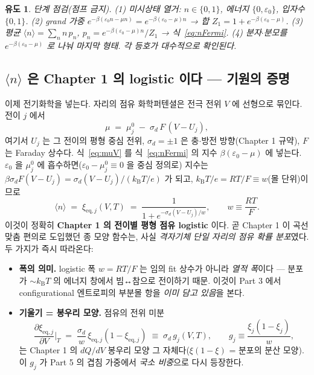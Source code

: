 \documentclass[11pt,a4paper]{article}
\newtheorem*{derivebox}{유도}
\newcommand{\eq}{\mathrm{eq}}
\newcommand{\kB}{k_{\mathrm B}}
\newcommand{\avg}[1]{\langle #1\rangle}
\begin{document}
\begin{derivebox}
\emph{단계 점검(점프 금지).} (1) 미시상태 열거: $n\in\{0,1\}$, 에너지 $\{0,\varepsilon_0\}$, 입자수 $\{0,1\}$.
(2) grand 가중 $e^{-\beta(\varepsilon_0 n-\mu n)}=e^{-\beta(\varepsilon_0-\mu)n}$ → 합 $Z_1=1+e^{-\beta(\varepsilon_0-\mu)}$.
(3) 평균 $\avg n=\sum_n n\,p_n$, $p_n=e^{-\beta(\varepsilon_0-\mu)n}/Z_1$ → 식~\eqref{eq:nFermi}.
(4) 분자$\cdot$분모를 $e^{-\beta(\varepsilon_0-\mu)}$ 로 나눠 마지막 형태. 각 등호가 대수적으로 확인된다.
\end{derivebox}

\subsection{$\avg n$ 은 Chapter 1 의 logistic 이다 — 기원의 증명}\label{sec:logistic}
이제 전기화학을 넣는다. 자리의 점유 화학퍼텐셜은 전극 전위 $V$ 에 선형으로 묶인다. 전이 $j$ 에서
\begin{equation}
\mu \;=\; \mu_j^0 \;-\; \sigma_d\,F\,(V-U_j),
\label{eq:muV}
\end{equation}
여기서 $U_j$ 는 그 전이의 평형 중심 전위, $\sigma_d=\pm1$ 은 충$\cdot$방전 방향(Chapter 1 규약), $F$ 는
Faraday 상수다. 식~\eqref{eq:muV} 를 식~\eqref{eq:nFermi} 의 지수 $\beta(\varepsilon_0-\mu)$ 에 넣는다.
$\varepsilon_0$ 을 $\mu_j^0$ 에 흡수하면($\varepsilon_0-\mu_j^0\equiv0$ 을 중심 정의로) 지수는
$\beta\sigma_d F(V-U_j)=\sigma_d(V-U_j)/(\kB T/e)$ 가 되고, $\kB T/e = RT/F\equiv w$(몰 단위)이므로
\begin{equation}
\boxed{\;
\avg n \;=\; \xi_{\eq,j}(V,T) \;=\; \frac{1}{1+e^{-\sigma_d (V-U_j)/w}},
\qquad w \equiv \frac{RT}{F}.
\;}
\label{eq:xilogistic}
\end{equation}
이것이 정확히 \textbf{Chapter 1 의 전이별 평형 점유 logistic} 이다. 곧 Chapter 1 이 곡선 맞춤 편의로
도입했던 종 모양 함수는, 사실 \emph{격자기체 단일 자리의 점유 확률 분포}였다. 두 가지가 즉시 따라온다:
\begin{itemize}[leftmargin=1.6em,itemsep=2pt]
\item \textbf{폭의 의미.} logistic 폭 $w=RT/F$ 는 임의 fit 상수가 아니라 \emph{열적 폭}이다 — 분포가
$\sim\kB T$ 의 에너지 창에서 빔↔참으로 전이하기 때문. 이것이 Part 3 에서 configurational 엔트로피의
부분몰 항을 \emph{이미 담고 있음}을 본다.
\item \textbf{기울기 = 봉우리 모양.} 점유의 전위 미분
\begin{equation}
\frac{\partial\xi_{\eq,j}}{\partial V}\Big|_T
  \;=\; \frac{\sigma_d}{w}\,\xi_{\eq,j}(1-\xi_{\eq,j})
  \;\equiv\; \sigma_d\,g_j(V,T),
\qquad g_j \equiv \frac{\xi_j(1-\xi_j)}{w},
\label{eq:gpeak}
\end{equation}
는 Chapter 1 의 $dQ/dV$ 봉우리 모양 그 자체다($\xi(1-\xi)$ = 분포의 분산 모양). 이 $g_j$ 가 Part 5 의
겹침 가중에서 \emph{국소 비중}으로 다시 등장한다.
\end{itemize}
\end{document}
